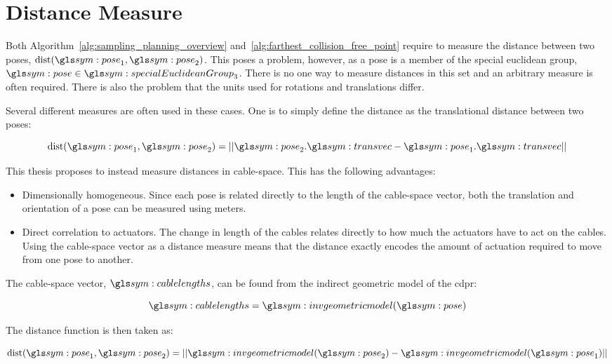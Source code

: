 	\section{Distance Measure}%
	\label{sec:distance_measure}

		Both Algorithm~\ref{alg:sampling_planning_overview}
		and~\ref{alg:farthest_collision_free_point} require to measure the
		distance between two poses, $\dist(\pose_1, \pose_2)$. This poses a
		problem, however, as a pose is a member of the special euclidean group,
		$\pose \in \specialEuclideanGroup{3}$. There is no one way to measure
		distances in this set and an arbitrary measure is often required. There
		is also the problem that the units used for rotations and translations
		differ.

		Several different measures are often used in these cases. One is to
		simply define the distance as the translational distance between two
		poses:

		\begin{equation}
			\dist(\pose_1, \pose_2) =
				\norm{%
					\pose_2.\transvec - \pose_1.\transvec
				}
			\label{eq:euclidean_distance}
		\end{equation}


		This thesis proposes to instead measure distances in cable-space. This
		has the following advantages:

		\begin{itemize}

			\item

				Dimensionally homogeneous. Since each pose is related directly
				to the length of the cable-space vector, both the translation
				and orientation of a pose can be measured using meters.

			\item

				Direct correlation to actuators. The change in length of the
				cables relates directly to how much the actuators have to act on
				the cables. Using the cable-space vector as a distance measure
				means that the distance exactly encodes the amount of actuation
				required to move from one pose to another.

		\end{itemize}

		The cable-space vector, $\cablelengths$, can be found from the indirect
		geometric model of the \gls{cdpr}:

		\begin{equation}
			\cablelengths = \invgeometricmodel(\pose)
		\end{equation}

		The distance function is then taken as:

		\begin{equation}
			\dist(\pose_1, \pose_2) =
				\norm{%
					\invgeometricmodel(\pose_2) - \invgeometricmodel(\pose_1)
				}
			\label{eq:distance_measure}
		\end{equation}

